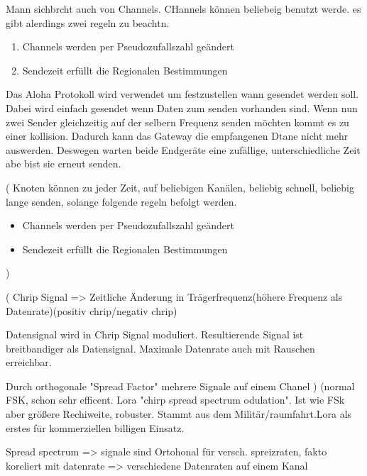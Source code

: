 \documentclass[a4paper,12pt]{article}
\begin{document}
            
            Mann sichbrcht auch von Channels. CHannels können beliebeig benutzt werde. es gibt alerdings zwei regeln zu beachtn. 
            \begin{enumerate}   
                \item Channels werden per Pseudozufallszahl geändert
                \item Sendezeit erfüllt die Regionalen Bestimmungen
            \end{enumerate}

            Das Aloha Protokoll wird verwendet um festzustellen wann gesendet werden soll. Dabei wird einfach gesendet wenn Daten zum senden vorhanden sind. Wenn nun zwei Sender gleichzeitig auf der selbern Frequenz senden möchten kommt es zu einer kollision. 
            Dadurch kann das Gateway die empfangenen Dtane nicht mehr auswerden. Deswegen warten beide Endgeräte eine zufällige, unterschiedliche Zeit abe bist sie erneut senden.

            \cite{LoRaSpec}(
                Knoten können zu jeder Zeit, auf beliebigen Kanälen, beliebig schnell, beliebig lange senden, solange folgende regeln befolgt werden.
                \begin{itemize}
                    
                        \item Channels werden per Pseudozufallszahl geändert
                        \item Sendezeit erfüllt die Regionalen Bestimmungen
                    
                \end{itemize}
            )

            \cite{LoraLimit}(
                Chrip Signal => Zeitliche Änderung in Trägerfrequenz(höhere Frequenz als Datenrate)(positiv chrip/negativ chrip)

                Datensignal wird in Chrip Signal moduliert. Resultierende Signal ist breitbandiger als Datensignal. Maximale Datenrate auch mit Rauschen erreichbar.

                Durch orthogonale "Spread Factor" mehrere Signale auf einem Chanel
            )
            \cite{WhatIsLoRa}(normal FSK, schon sehr efficent. Lora "chirp spread spectrum odulation". Ist wie FSk aber größere Rechiweite, robuster. Stammt aus dem Militär/raumfahrt.Lora als erstes für kommerziellen billigen Einsatz.
            
            Spread spectrum => signale sind Ortohonal für versch. spreizraten, fakto koreliert mit datenrate => verschiedene Datenraten auf einem Kanal
            
\end{document}
